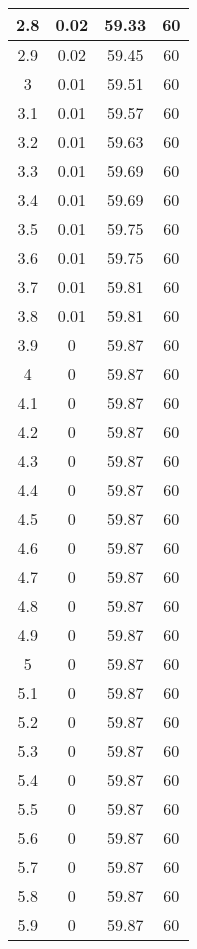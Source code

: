 \begin{longtable}[c]{|c|c|c|c|}
   2.8 & 	0.02 & 	59.33 & 60  \\ \hline 
   2.9 & 	0.02 & 	59.45 & 60  \\ \hline 
   3   & 	0.01 & 	59.51 & 60  \\ \hline 
   3.1 & 	0.01 & 	59.57 & 60  \\ \hline 
   3.2 & 	0.01 & 	59.63 & 60  \\ \hline 
   3.3 & 	0.01 & 	59.69 & 60  \\ \hline 
   3.4 & 	0.01 & 	59.69 & 60  \\ \hline 
   3.5 & 	0.01 & 	59.75 & 60  \\ \hline 
   3.6 & 	0.01 & 	59.75 & 60  \\ \hline 
   3.7 & 	0.01 & 	59.81 & 60  \\ \hline 
   3.8 & 	0.01 & 	59.81 & 60  \\ \hline 
   3.9 & 	0    & 	59.87 & 60  \\ \hline 
   4   & 	0    & 	59.87 & 60  \\ \hline 
   4.1 & 	0    & 	59.87 & 60  \\ \hline 
   4.2 & 	0    & 	59.87 & 60  \\ \hline 
   4.3 & 	0    & 	59.87 & 60  \\ \hline 
   4.4 & 	0    & 	59.87 & 60  \\ \hline 
   4.5 & 	0    & 	59.87 & 60  \\ \hline 
   4.6 & 	0    & 	59.87 & 60  \\ \hline 
   4.7 & 	0    & 	59.87 & 60  \\ \hline 
   4.8 & 	0    & 	59.87 & 60  \\ \hline 
   4.9 & 	0    & 	59.87 & 60  \\ \hline 
   5   & 	0    & 	59.87 & 60  \\ \hline 
   5.1 & 	0    & 	59.87 & 60  \\ \hline 
   5.2 & 	0    & 	59.87 & 60  \\ \hline 
   5.3 & 	0    & 	59.87 & 60  \\ \hline 
   5.4 & 	0    & 	59.87 & 60  \\ \hline 
   5.5 & 	0    & 	59.87 & 60  \\ \hline 
   5.6 & 	0    & 	59.87 & 60  \\ \hline 
   5.7 & 	0    & 	59.87 & 60  \\ \hline 
   5.8 & 	0    & 	59.87 & 60  \\ \hline 
   5.9 & 	0    & 	59.87 & 60  \\ \hline 
  \end{longtable}
